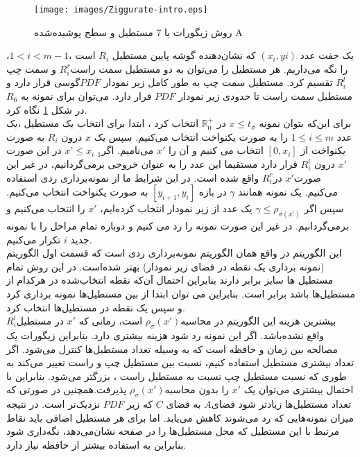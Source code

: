     \begin{figure}[!htb]
      	\centering
      	\texttt{[image: images/Ziggurate-intro.eps]}
      	\caption{روش زیگورات با 7 مستطیل و سطح پوشیده‌شده A}
      	\label{Ziggurate-intro}


      \end{figure}

یک جفت عدد $(x_{i},y{i})$ که نشان‌دهنده گوشه پایین مستطیل $R_{i}$ است ،$1< i < m - 1$، را نگه می‌داریم. 
هر مستطیل را می‌توان به دو مستطیل  سمت راست$ R^{r}_{i}$ و  سمت چپ$ R^{l}_{i}$ تقسیم کرد. مستطیل سمت چپ به طور کامل زیر نمودار $PDF$گوسی قرار دارد و مستطیل سمت راست تا حدودی زیر نمودار $PDF$  قرار دارد. می‌توان برای نمونه به $R_{6}$  در شکل \ref{Ziggurate-intro} نگاه کرد.
\\
برای این‌که بتوان نمونه $x \leq t_{\sigma}$  در $\mathbb{R}^{+}_{0}$  انتخاب کرد ، ابتدا برای انتخاب یک مستطیل ،یک عدد $1 \leq i \leq m$ را به صورت یکنواخت انتخاب می‌کنیم.  سپس یک $ x$  درون $R_{i}$ به صورت یکنواخت  از  $[0, x_{i}]$ انتخاب می کنیم  و آن را $x'$  می‌نامیم. اگر$ x’\leq   x_{i – 1}$   در این صورت  $x'$   درون $ R^{l}_{i}$ قرار دارد مستقیما این عدد را به عنوان خروجی برمی‌گردانیم، در غیر این صورت$x'$  در$ R^{r}_{i}$ واقع شده است. در این شرایط ما از نمونه‌برداری ردی استفاده می‌کنیم. یک نمونه همانند $\gamma$  در بازه $ [y_{i+1}, y_{i}]$ به صورت یکنواخت انتخاب می‌کنیم. سپس اگر $\gamma \leq \rho _{\sigma (x')}$ یک عدد از زیر نمودار انتخاب کرده‌ایم،   $x'$ را انتخاب می‌کنیم و برمی‌گردانیم. در غیر این صورت نمونه را رد می کنیم و دوباره تمام مراحل را  با نمونه‌ جدید $i$  تکرار می‌کنیم.
\\
این الگوریتم در واقع همان الگوریتم نمونه‌برداری ردی است که قسمت اول الگوریتم (نمونه برداری یک نقطه در فضای زیر نمودار) بهتر شده‌است. در این روش تمام مستطیل ها سایز برابر دارند بنابراین احتمال آن‌که نقطه انتخاب‌شده در هرکدام از  مستطیل‌ها باشد برابر است. بنابراین می توان ابتدا از بین مستطیل‌ها نمونه برداری کرد و سپس یک نقطه در مستطیل‌ها انتخاب کرد.
\\
بیشترین هزینه این الگوریتم‌ در محاسبه$\rho_{\sigma}(x')$  است، زمانی که  $x'$ در مستطیل$ R^{l}_{i}$ واقع نشده‌باشد.  اگر این نمونه رد شود هزینه بیشتری دارد. بنابراین زیگورات یک مصالحه بین زمان و حافظه است که به وسیله تعداد مستطیل‌ها کنترل می‌شود. اگر تعداد بیشتری مستطیل استفاده کنیم، نسبت بین مستطیل  چپ و راست تغییر می‌کند به طوری که نسبت مستطیل چپ نسبت به مستطیل راست ، بزرگتر می‌شود. بنابراین با احتمال بیشتری می‌توان  یک $x'$ را بدون محاسبه$\rho_{\sigma}(x')$    پذیرفت.همچنین در صورتی که تعداد مستطیل‌ها زیادتر شود فضای$ A$  به فضای $C$   که زیر $PDF$ نزدیک‌تر است. در نتیجه میزان نمونه‌‌هایی که رد می‌شوند کاهش می‌یابد. اما برای هر مستطیل اضافی باید نقاط مرتبط با این مستطیل  که محل مستطیل‌ها را در  صفحه نشان‌می‌دهد، نگه‌داری شود بنابراین به استفاده بیشتر از حافظه نیاز دارد.

